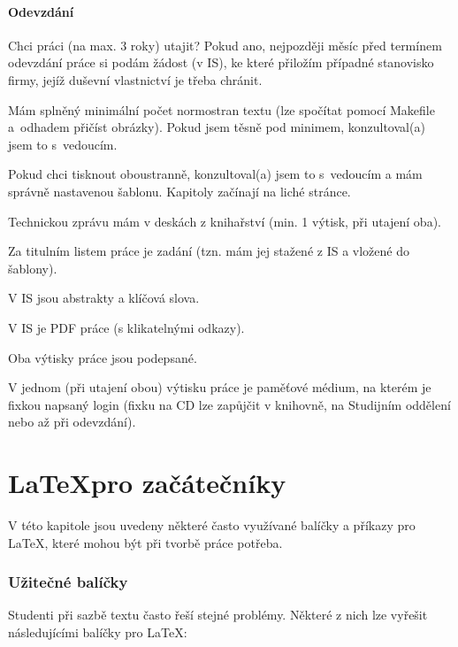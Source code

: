 \subsubsection*{Odevzdání}

\begin{checklist}
\item Chci práci (na max. 3 roky) utajit? Pokud ano, nejpozději měsíc před termínem odevzdání práce si podám žádost (v IS), ke které přiložím případné stanovisko firmy, jejíž duševní vlastnictví je třeba chránit.
\item Mám splněný minimální počet normostran textu (lze spočítat pomocí Makefile a~odhadem přičíst obrázky). Pokud jsem těsně pod minimem, konzultoval(a) jsem to s~vedoucím.
\item Pokud chci tisknout oboustranně, konzultoval(a) jsem to s~vedoucím a mám správně nastavenou šablonu. Kapitoly začínají na liché stránce.
\item Technickou zprávu mám v deskách z knihařství (min. 1 výtisk, při utajení oba).
\item Za titulním listem práce je zadání (tzn. mám jej stažené z IS a vložené do šablony).
\item V IS jsou abstrakty a klíčová slova.
\item V IS je PDF práce (s klikatelnými odkazy).
\item Oba výtisky práce jsou podepsané.
\item V jednom (při utajení obou) výtisku práce je paměťové médium, na kterém je fixkou napsaný login (fixku na CD lze zapůjčit v knihovně, na Studijním oddělení nebo až při odevzdání).
\end{checklist}


\chapter{\LaTeX pro začátečníky}
\label{latex}

V této kapitole jsou uvedeny některé často využívané balíčky a příkazy pro \LaTeX{}, které mohou být při tvorbě práce potřeba.

\subsection*{Užitečné balíčky}

Studenti při sazbě textu často řeší stejné problémy. Některé z nich lze vyřešit následujícími balíčky pro \LaTeX:


